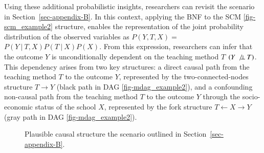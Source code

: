 \documentclass[
  authoryear,
  review,
  1p]{elsarticle}
\begin{document}
Using these additional probabilistic insights, researchers can revisit
the scenario in Section~\ref{sec-appendix-B}. In this context, applying
the BNF to the SCM \ref{fig-scm_example2} structure, enables the
representation of the joint probability distribution of the observed
variables as \(P(Y, T, X) =\) \(P(Y \:|\:T, X) P(T \:|\:X) P(X)\). From
this expression, researchers can infer that the outcome \(Y\) is
unconditionally dependent on the teaching method \(T\)
\((Y \:\not\bot\:T)\). This dependency arises from two key structures: a
direct causal path from the teaching method \(T\) to the outcome \(Y\),
represented by the two-connected-nodes structure \(T \rightarrow Y\)
(black path in DAG \ref{fig-mdag_example2}), and a confounding
non-causal path from the teaching method \(T\) to the outcome \(Y\)
through the socio-economic status of the school \(X\), represented by
the fork structure \(T \leftarrow X \rightarrow Y\) (gray path in DAG
\ref{fig-mdag_example2}).

\begin{figure}

\begin{minipage}{0.50\linewidth}

\centering{

\[
\begin{aligned}
  X & := x \\
  T & := f_{T}(x,e_{T}) \\
  Y & := f_{Y}(T,x,e_{Y}) \\
  e_{T} & \:\bot\:e_{X} \\
  e_{T} & \:\bot\:e_{Y} \\
  e_{X} & \:\bot\:e_{Y}
\end{aligned}
\]

}


\end{minipage}%
%
\begin{minipage}{0.50\linewidth}



\end{minipage}%

\caption{\label{fig-example2}Plausible causal structure the scenario
outlined in Section~\ref{sec-appendix-B}.}

\end{figure}%
\end{document}

